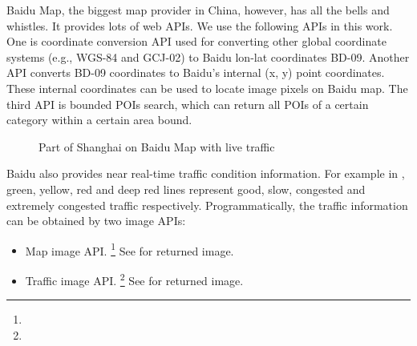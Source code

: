 Baidu Map, the biggest map provider in China, however, has all the bells and whistles. 
It provides lots of web APIs. We use the following APIs in this
work. One is coordinate conversion API used for converting other 
global coordinate systems (e.g., WGS-84 and GCJ-02) to Baidu lon-lat 
coordinates BD-09. Another API converts BD-09 coordinates
to Baidu's internal (x, y) point coordinates. These internal coordinates
can be used to locate image pixels on Baidu map.
The third API is bounded POIs search, which can return all POIs of a certain category
within a certain area bound.


\begin{figure}[th]
	\small
	\centering
	\caption{Part of Shanghai on Baidu Map with live traffic}
	\label{fig:baidutraffic}
\end{figure}

Baidu also provides near real-time traffic condition information. For example in , green, 
yellow, red and deep red lines represent
good, slow, congested and extremely congested traffic respectively. 
Programmatically, the traffic information can be obtained by 
two image APIs:
\begin{itemize}\itemsep0pt
	\item Map image API.		\footnote{
		}
		See  for returned image.
	\item Traffic image API.
		\footnote{
		} See  for returned image.
		
\end{itemize}

